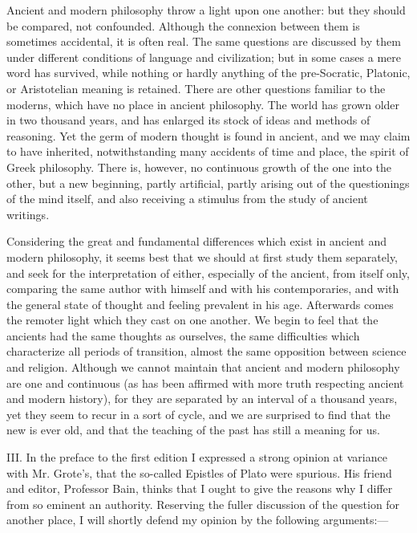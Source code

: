\documentclass[11pt,letter]{article}
\begin{document}
\par  Ancient and modern philosophy throw a light upon one another: but they should be compared, not confounded. Although the connexion between them is sometimes accidental, it is often real. The same questions are discussed by them under different conditions of language and civilization; but in some cases a mere word has survived, while nothing or hardly anything of the pre-Socratic, Platonic, or Aristotelian meaning is retained. There are other questions familiar to the moderns, which have no place in ancient philosophy. The world has grown older in two thousand years, and has enlarged its stock of ideas and methods of reasoning. Yet the germ of modern thought is found in ancient, and we may claim to have inherited, notwithstanding many accidents of time and place, the spirit of Greek philosophy. There is, however, no continuous growth of the one into the other, but a new beginning, partly artificial, partly arising out of the questionings of the mind itself, and also receiving a stimulus from the study of ancient writings.

\par  Considering the great and fundamental differences which exist in ancient and modern philosophy, it seems best that we should at first study them separately, and seek for the interpretation of either, especially of the ancient, from itself only, comparing the same author with himself and with his contemporaries, and with the general state of thought and feeling prevalent in his age. Afterwards comes the remoter light which they cast on one another. We begin to feel that the ancients had the same thoughts as ourselves, the same difficulties which characterize all periods of transition, almost the same opposition between science and religion. Although we cannot maintain that ancient and modern philosophy are one and continuous (as has been affirmed with more truth respecting ancient and modern history), for they are separated by an interval of a thousand years, yet they seem to recur in a sort of cycle, and we are surprised to find that the new is ever old, and that the teaching of the past has still a meaning for us.

\par  III. In the preface to the first edition I expressed a strong opinion at variance with Mr. Grote's, that the so-called Epistles of Plato were spurious. His friend and editor, Professor Bain, thinks that I ought to give the reasons why I differ from so eminent an authority. Reserving the fuller discussion of the question for another place, I will shortly defend my opinion by the following arguments:—
\end{document}
